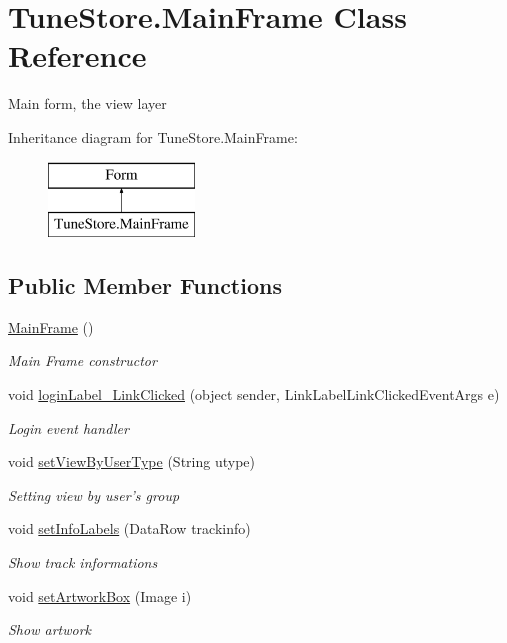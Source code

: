 \hypertarget{class_tune_store_1_1_main_frame}{\section{Tune\+Store.\+Main\+Frame Class Reference}
\label{class_tune_store_1_1_main_frame}
}


Main form, the view layer  


Inheritance diagram for Tune\+Store.\+Main\+Frame\+:\begin{figure}[H]
\begin{center}
\leavevmode
\includegraphics[height=2.000000cm]{class_tune_store_1_1_main_frame}
\end{center}
\end{figure}
\subsection*{Public Member Functions}
\begin{DoxyCompactItemize}
\item 
\hyperlink{class_tune_store_1_1_main_frame_ab0a7fd425cfbe4d9ed5351dbe0f0899a}{Main\+Frame} ()
\begin{DoxyCompactList}\small\item\em Main Frame constructor \end{DoxyCompactList}\item 
void \hyperlink{class_tune_store_1_1_main_frame_a8a32f6966fd90df24a85fadcea8ec7d1}{login\+Label\+\_\+\+Link\+Clicked} (object sender, Link\+Label\+Link\+Clicked\+Event\+Args e)
\begin{DoxyCompactList}\small\item\em Login event handler \end{DoxyCompactList}\item 
void \hyperlink{class_tune_store_1_1_main_frame_aaf0481f5c8f99cb447fc232ca5a698c1}{set\+View\+By\+User\+Type} (String utype)
\begin{DoxyCompactList}\small\item\em Setting view by user's group \end{DoxyCompactList}\item 
void \hyperlink{class_tune_store_1_1_main_frame_a919bb15a5b669920816a76924a5634c6}{set\+Info\+Labels} (Data\+Row trackinfo)
\begin{DoxyCompactList}\small\item\em Show track informations \end{DoxyCompactList}\item 
void \hyperlink{class_tune_store_1_1_main_frame_ab9e2975a8e69eef23679870fe908d373}{set\+Artwork\+Box} (Image i)
\begin{DoxyCompactList}\small\item\em Show artwork \end{DoxyCompactList}\end{DoxyCompactItemize}
